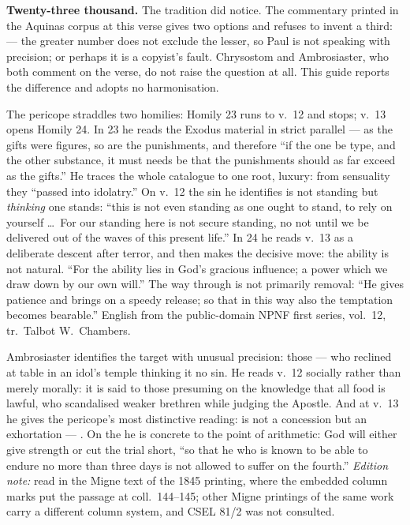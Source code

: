 \textbf{Twenty-three thousand.} The tradition did notice. The commentary
printed in the Aquinas corpus at this verse gives two options and refuses to
invent a third:  --- the greater
number does not exclude the lesser, so Paul is not speaking with precision;
or perhaps it is a copyist's fault. Chrysostom and Ambrosiaster, who both
comment on the verse, do not raise the question at all. This guide reports the
difference and adopts no harmonisation.

\begin{witnessnote}
The pericope straddles two homilies: Homily 23 runs to v.~12 and stops;
v.~13 opens Homily 24. In 23 he reads the Exodus material in strict parallel
--- as the gifts were figures, so are the punishments, and therefore ``if the
one be type, and the other substance, it must needs be that the punishments
should as far exceed as the gifts.'' He traces the whole catalogue to one
root, luxury: from sensuality they ``passed into idolatry.'' On v.~12 the sin
he identifies is not standing but \textit{thinking} one stands: ``this is not
even standing as one ought to stand, to rely on yourself \dots\ For our
standing here is not secure standing, no not until we be delivered out of the
waves of this present life.'' In 24 he reads v.~13 as a deliberate descent
after terror, and then makes the decisive move: the ability is not natural.
``For the ability lies in God's gracious influence; a power which we draw down
by our own will.'' The way through is not primarily removal: ``He gives
patience and brings on a speedy release; so that in this way also the
temptation becomes bearable.'' English from the public-domain NPNF first
series, vol.~12, tr.\ Talbot W.~Chambers.
\end{witnessnote}

\begin{witnessnote}
Ambrosiaster identifies the target with unusual precision: those  --- who reclined at table in an
idol's temple thinking it no sin. He reads v.~12 socially rather than merely
morally: it is said to those presuming on the knowledge that all food is
lawful, who scandalised weaker brethren while judging the Apostle. And at
v.~13 he gives the pericope's most distinctive reading:  is not a concession but an exhortation --- . On the
 he is concrete to the point of arithmetic: God will either
give strength or cut the trial short, ``so that he who is known to be able to
endure no more than three days is not allowed to suffer on the fourth.''
\textit{Edition note:} read in the Migne text of the 1845 printing, where the
embedded column marks put the passage at coll.~144--145; other Migne printings
of the same work carry a different column system, and CSEL 81/2 was not
consulted.
\end{witnessnote}

